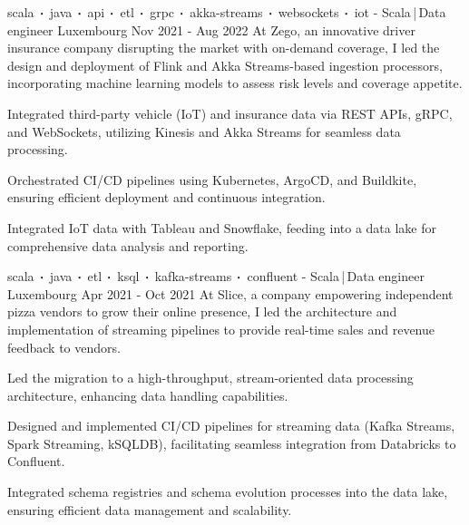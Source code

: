 \begin{cventries}

    \cventry
    {scala$\sqbig$java$\sqbig$api$\sqbig$etl$\sqbig$grpc$\sqbig$akka-streams$\sqbig$websockets$\sqbig$iot}
    { - Scala\,|\,Data engineer}
    {Luxembourg}
    {Nov 2021 - Aug 2022}
    {At Zego, an innovative driver insurance company disrupting the market with on-demand coverage, I led the design and deployment of Flink and Akka Streams-based ingestion processors, incorporating machine learning models to assess risk levels and coverage appetite.}
    {
        \begin{cvitems}
            \item{Integrated third-party vehicle (IoT) and insurance data via REST APIs, gRPC, and WebSockets, utilizing Kinesis and Akka Streams for seamless data processing.}
            \item{Orchestrated CI/CD pipelines using Kubernetes, ArgoCD, and Buildkite, ensuring efficient deployment and continuous integration.}
            \item{Integrated IoT data with Tableau and Snowflake, feeding into a data lake for comprehensive data analysis and reporting.}
        \end{cvitems}
    }


    \cventry
    {scala$\sqbig$java$\sqbig$etl$\sqbig$ksql$\sqbig$kafka-streams$\sqbig$confluent}
    { - Scala\,|\,Data engineer}
    {Luxembourg}
    {Apr 2021 - Oct 2021}
    {At Slice, a company empowering independent pizza vendors to grow their online presence, I led the architecture and implementation of streaming pipelines to provide real-time sales and revenue feedback to vendors.}
    {
        \begin{cvitems}
            \item{Led the migration to a high-throughput, stream-oriented data processing architecture, enhancing data handling capabilities.}
            \item{Designed and implemented CI/CD pipelines for streaming data (Kafka Streams, Spark Streaming, kSQLDB), facilitating seamless integration from Databricks to Confluent.}
            \item{Integrated schema registries and schema evolution processes into the data lake, ensuring efficient data management and scalability.}
        \end{cvitems}
    }


\end{cventries}
